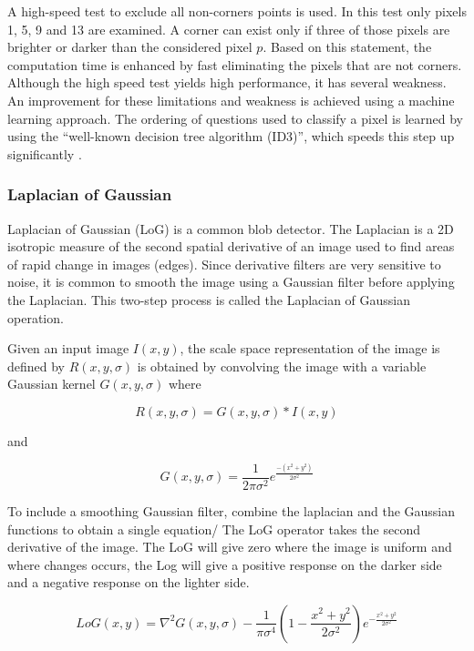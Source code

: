\documentclass[9pt,shortpaper,twoside,web]{ieeecolor}
\begin{document}
A high-speed test to exclude all non-corners points is used. In this test only pixels 1, 5, 9 and 13 are examined. A corner can exist only if three of those pixels are brighter or darker than the considered pixel $p$. Based on this statement, the computation time is enhanced by fast eliminating the pixels that are not corners. Although the high speed test yields high performance, it has several weakness. An improvement for these limitations and weakness is achieved using a machine learning approach. The ordering of questions used to classify a pixel is learned by using the ``well-known decision tree algorithm (ID3)'', which speeds this step up significantly \cite{b2}.
\\

\subsubsection{Laplacian of Gaussian}

Laplacian of Gaussian (LoG) is a common blob detector. The Laplacian is a 2D isotropic measure of the second spatial derivative of an image used to find areas of rapid change in images (edges). Since derivative filters are very sensitive to noise, it is common to smooth the image using a Gaussian filter before applying the Laplacian. This two-step process is called the Laplacian of Gaussian operation.

Given an input image $I(x, y)$, the scale space representation of the image is defined by $R(x, y, \sigma)$ is obtained by convolving the image with a variable Gaussian kernel $G(x, y, \sigma)$ where

\begin{equation}
\label{eq6}
R(x, y, \sigma) = G(x, y, \sigma) * I(x, y)
\end{equation}

and

\begin{equation}
\label{eq7}
G(x, y, \sigma) = \frac{1}{2 \pi \sigma^2} e^{\frac{-(x^2 + y^2)}{2\sigma^2}}
\end{equation}

To include a smoothing Gaussian filter, combine the laplacian and the Gaussian functions to obtain a single equation/ The LoG operator takes the second derivative of the image. The LoG will give zero where the image is uniform and where changes occurs, the Log will give a positive response on the darker side and a negative response on the lighter side.

\begin{equation}
\label{8}
LoG(x, y) = \nabla^2G(x, y, \sigma) - \frac{1}{\pi \sigma^4}( 1- \frac{x^2 + y^2}{2 \sigma^2}) e^{- \frac{x^2 + y^2}{2 \sigma^2}}
\end{equation}
\end{document}
